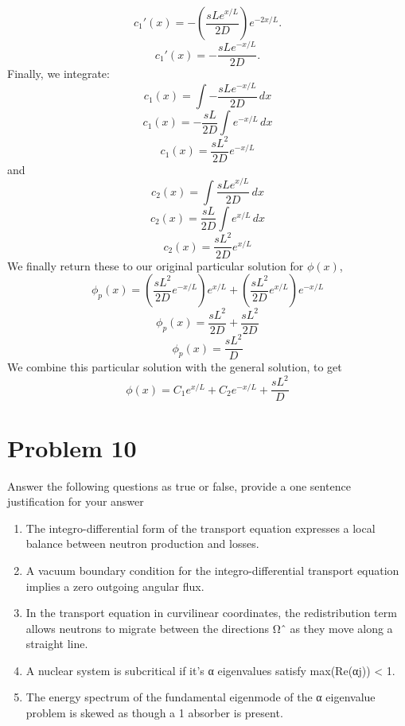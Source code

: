 \documentclass{article}
\begin{document}
$$ c_1'(x) = -\left(\frac{sLe^{x/L}}{2D}\right)e^{-2x/L} .$$
$$ c_1'(x) = -\frac{sLe^{-x/L}}{2D} .$$
Finally, we integrate:
$$ c_1(x) = \int -\frac{sLe^{-x/L}}{2D}\, dx $$
$$ c_1(x) = -\frac{sL}{2D}\int e^{-x/L}\, dx $$
$$ c_1(x) = \frac{sL^2}{2D}e^{-x/L}$$
and
$$ c_2(x) = \int \frac{sLe^{x/L}}{2D}\, dx $$
$$ c_2(x) = \frac{sL}{2D}\int e^{x/L}\, dx $$
$$ c_2(x) = \frac{sL^2}{2D}e^{x/L}$$
We finally return these to our original particular solution for $\phi(x)$,
$$ \phi_p(x) = \left(\frac{sL^2}{2D}e^{-x/L}\right)e^{x/L} + \left(\frac{sL^2}{2D}e^{x/L}\right)e^{-x/L} $$
$$ \phi_p(x) = \frac{sL^2}{2D} + \frac{sL^2}{2D} $$
$$ \phi_p(x) = \frac{sL^2}{D} $$
We combine this particular solution with the general solution, to get
$$\boxed{ \phi(x) = C_1e^{x/L} + C_2e^{-x/L} + \frac{sL^2}{D} }$$



\section*{Problem 10}

Answer the following questions as true or false, provide a one sentence justification for your answer\\
\begin{enumerate}
\item The integro-differential form of the transport equation expresses a local balance between neutron production and losses.
\item A vacuum boundary condition for the integro-differential transport equation implies a zero outgoing angular flux.
\item In the transport equation in curvilinear coordinates, the redistribution term allows neutrons to migrate between the directions Ωˆ as they move along a straight line.
\item A nuclear system is subcritical if it’s α eigenvalues satisfy max(Re(αj)) < 1.
\item The energy spectrum of the fundamental eigenmode of the α eigenvalue problem is skewed as though a 1 absorber is present.
\end{enumerate}




\end{document}
